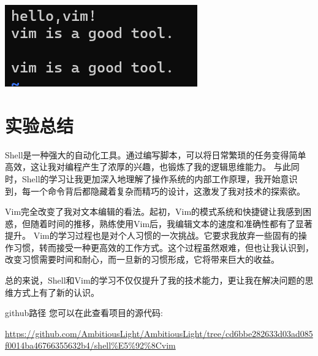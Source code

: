 \documentclass{article}
\begin{document}
	\noindent
	\begin{minipage}{\linewidth}
		\centering
		\includegraphics[width=0.5\linewidth]{example22.png}
		\label{fig:example}
	\end{minipage}
	
	
	
	
	\section{实验总结}
	Shell是一种强大的自动化工具。通过编写脚本，可以将日常繁琐的任务变得简单高效，这让我对编程产生了浓厚的兴趣，也锻炼了我的逻辑思维能力。
	与此同时，Shell的学习让我更加深入地理解了操作系统的内部工作原理，我开始意识到，每一个命令背后都隐藏着复杂而精巧的设计，这激发了我对技术的探索欲。
	
	Vim完全改变了我对文本编辑的看法。起初，Vim的模式系统和快捷键让我感到困惑，但随着时间的推移，熟练使用Vim后，我编辑文本的速度和准确性都有了显著提升。
	Vim的学习过程也是对个人习惯的一次挑战。它要求我放弃一些固有的操作习惯，转而接受一种更高效的工作方式。这个过程虽然艰难，但也让我认识到，改变习惯需要时间和耐心，而一旦新的习惯形成，它将带来巨大的收益。
	
	总的来说，Shell和Vim的学习不仅仅提升了我的技术能力，更让我在解决问题的思维方式上有了新的认识。
	
	github路径
	您可以在此查看项目的源代码: 
	
	\url{https://github.com/AmbitiousLight/AmbitiousLight/tree/cd6bbe282633d03ad085f0014ba46766355632b4/shell%E5%92%8Cvim}
\end{document}
